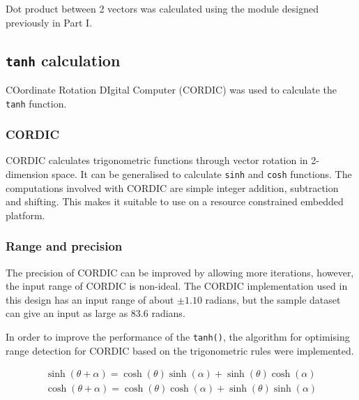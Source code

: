 \documentclass[journal]{IEEEtran}
\begin{document}
Dot product between 2 vectors was calculated using the module designed previously in Part I.


\subsection{\texttt{tanh} calculation}

COordinate Rotation DIgital Computer (CORDIC) \cite{volder1959cordic} was used to calculate the \texttt{tanh} function.

\subsubsection{CORDIC}

CORDIC calculates trigonometric functions through vector rotation in 2-dimension space. It can be generalised to calculate \texttt{sinh} and \texttt{cosh} functions. The computations involved with CORDIC are simple integer addition, subtraction and shifting. This makes it suitable to use on a resource constrained embedded platform.

\subsubsection{Range and precision}\label{subsubsec:range}

The precision of CORDIC can be improved by allowing more iterations, however, the input range of CORDIC is non-ideal. The CORDIC implementation used in this design has an input range of about $\pm 1.10$ radians, but the sample dataset can give an input as large as $83.6$ radians.

In order to improve the performance of the \texttt{tanh()}, the algorithm for optimising range detection for CORDIC based on the trigonometric rules were implemented. 

\begin{align}
\sinh(\theta + \alpha) = \cosh(\theta)\sinh(\alpha) + \sinh(\theta)\cosh(\alpha)
\label{eq:tri}\\
\cosh(\theta + \alpha) = \cosh(\theta)\cosh(\alpha) + \sinh(\theta)\sinh(\alpha)
\end{align}
\end{document}
